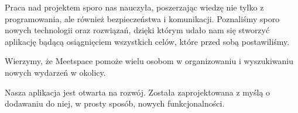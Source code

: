 	Praca nad projektem sporo nas nauczyła, poszerzając wiedzę nie tylko z programowania, ale również bezpieczeństwa i komunikacji. Poznaliśmy sporo nowych technologii oraz rozwiązań, dzięki którym udało nam się stworzyć aplikację bądącą osiągnięciem wszystkich celów, które przed sobą postawiliśmy.

	Wierzymy, że Meetspace pomoże wielu osobom w organizowaniu i wyszukiwaniu nowych wydarzeń w okolicy.

	Nasza aplikacja jest otwarta na rozwój. Została zaprojektowana z myślą o dodawaniu do niej, w prosty sposób, nowych funkcjonalności.
